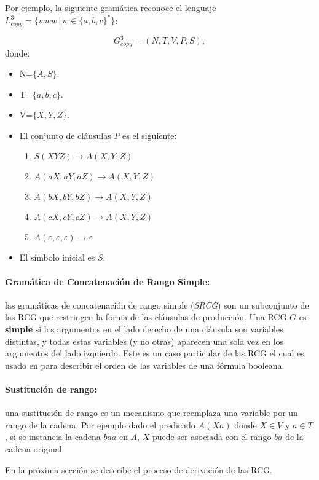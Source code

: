 \documentclass[12pt]{article}
\begin{document}
Por ejemplo, la siguiente gramática reconoce el lenguaje $L^3_{copy}=\{www\,|\,w\in \{a,b,c\}^*\}$:

\[
    G^3_{copy} = (N, T, V, P, S),
\]
donde:

\begin{itemize}
    \item  N=$\{A,S\}$.
    \item T=$\{a,b,c\}$.
    \item V=$\{X,Y,Z\}$.
    \item El conjunto de cláusulas $P$ es el siguiente:
          \begin{enumerate}
              \item $S(XYZ)\to A(X,Y,Z)$
              \item $A(aX,aY,aZ)\to A(X,Y,Z)$
              \item $A(bX,bY,bZ)\to A(X,Y,Z)$
              \item $A(cX,cY,cZ)\to A(X,Y,Z)$
              \item $A(\varepsilon,\varepsilon,\varepsilon)\to \varepsilon$
          \end{enumerate}
    \item El símbolo inicial es $S$.
\end{itemize}


\paragraph{Gramática de Concatenación de Rango Simple:} las gramáticas de concatenación de rango simple (\textit{SRCG}) son un subconjunto de las RCG que restringen la forma de las cláusulas de producción.
Una RCG $G$ es \textbf{simple} si los argumentos en el lado derecho de una cláusula son variables distintas, y todas estas variables (y no otras) aparecen una sola vez en los argumentos del lado izquierdo.
Este es un caso particular de las RCG el cual es usado en \cite{aSRCSAT} para describir el orden de las variables
de una fórmula booleana.

\paragraph{Sustitución de rango:} una sustitución de rango es un mecanismo que reemplaza una
variable por un rango de la cadena. Por ejemplo dado el predicado $A(Xa)$ donde $X \in V$ y $a \in T$,
si se instancia la cadena $baa$ en $A$, $X$ puede ser asociada con el rango $ba$ de la cadena original.

En la próxima sección se describe el proceso de derivación de las RCG.
\end{document}
